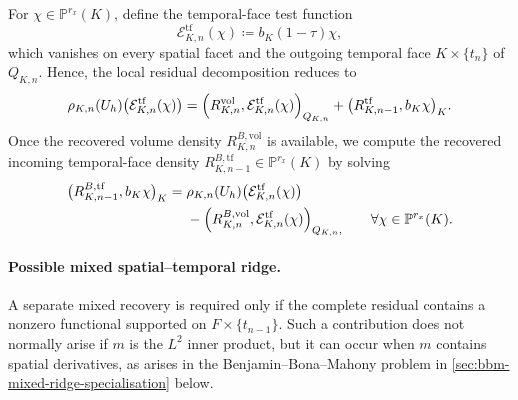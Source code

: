 For \(\chi\in\mathbb P^{r_x}(K)\), define the temporal-face test function
\begin{equation}
\mathcal E_{K,n}^{\mathrm{tf}}(\chi) \coloneqq
b_K(1-\tau)\chi,
\label{eq:temporal-recovery-test}
\end{equation}
which vanishes on every spatial facet and the outgoing temporal face \(K\times\{t_n\}\) of \(Q_{K,n}\). Hence, the local residual decomposition reduces to
\begin{equation}
\rho_{K,n}(U_h)
\bigl(\mathcal E_{K,n}^{\mathrm{tf}}(\chi)\bigr)
=
\Bigl(
R_{K,n}^{\mathrm{vol}},
\mathcal E_{K,n}^{\mathrm{tf}}(\chi)
\Bigr)_{Q_{K,n}}
+
\bigl(
R_{K,n-1}^{\mathrm{tf}},
b_K\chi
\bigr)_K .
\label{eq:temporal-cone-support-splitting}
\end{equation}
Once the recovered volume density \(R_{K,n}^{B,\mathrm{vol}}\) is available, we compute the recovered incoming temporal-face density \(R_{K,n-1}^{B,\mathrm{tf}}\in\mathbb P^{r_x}(K)\) by solving
\begin{equation}
\begin{aligned}
\bigl(
R_{K,n-1}^{B,\mathrm{tf}},b_K\chi
\bigr)_K
={}&
\rho_{K,n}(U_h)
\bigl(\mathcal E_{K,n}^{\mathrm{tf}}(\chi)\bigr) \\
&-
\Bigl(
R_{K,n}^{B,\mathrm{vol}},
\mathcal E_{K,n}^{\mathrm{tf}}(\chi)
\Bigr)_{Q_{K,n},
}
\qquad
\forall\chi\in\mathbb P^{r_x}(K).
\end{aligned}
\label{eq:temporal-facet-projection}
\end{equation}


\paragraph{Possible mixed spatial--temporal ridge.}
A separate mixed recovery is required only if the complete residual contains a nonzero functional supported on \(F\times\{t_{n-1}\}\). Such a contribution does not normally arise if $m$ is the \(L^2\) inner product, but it can occur when $m$ contains spatial derivatives, as arises in the Benjamin--Bona--Mahony problem in \cref{sec:bbm-mixed-ridge-specialisation} below.

